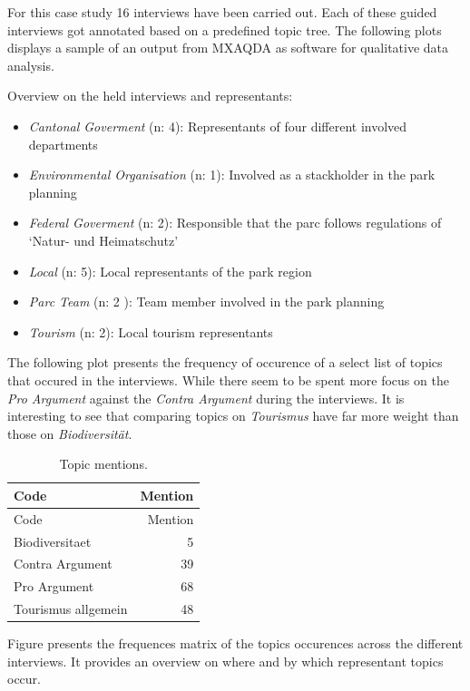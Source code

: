 \documentclass[]{article}
\providecommand{\tightlist}{%
  \setlength{\itemsep}{0pt}\setlength{\parskip}{0pt}}
\begin{document}
For this case study 16 interviews have been carried out. Each of these
guided interviews got annotated based on a predefined topic tree. The
following plots displays a sample of an output from MXAQDA as software
for qualitative data analysis.

Overview on the held interviews and representants:

\begin{itemize}
\tightlist
\item
  \emph{Cantonal Goverment} (n: 4): Representants of four different
  involved departments
\item
  \emph{Environmental Organisation} (n: 1): Involved as a stackholder in
  the park planning
\item
  \emph{Federal Goverment} (n: 2): Responsible that the parc follows
  regulations of `Natur- und Heimatschutz'
\item
  \emph{Local} (n: 5): Local representants of the park region
\item
  \emph{Parc Team} (n: 2 ): Team member involved in the park planning
\item
  \emph{Tourism} (n: 2): Local tourism representants
\end{itemize}

The following plot presents the frequency of occurence of a select list
of topics that occured in the interviews. While there seem to be spent
more focus on the \emph{Pro Argument} against the \emph{Contra Argument}
during the interviews. It is interesting to see that comparing topics on
\emph{Tourismus} have far more weight than those on
\emph{Biodiversität}.

\begin{longtable}[c]{@{}lr@{}}
\caption{Topic mentions.}\tabularnewline
\toprule
Code & Mention\tabularnewline
\midrule
\endfirsthead
\toprule
Code & Mention\tabularnewline
\midrule
\endhead
Biodiversitaet & 5\tabularnewline
Contra Argument & 39\tabularnewline
Pro Argument & 68\tabularnewline
Tourismus allgemein & 48\tabularnewline
\bottomrule
\end{longtable}

Figure presents the frequences matrix of the topics occurences across
the different interviews. It provides an overview on where and by which
representant topics occur.
\end{document}
